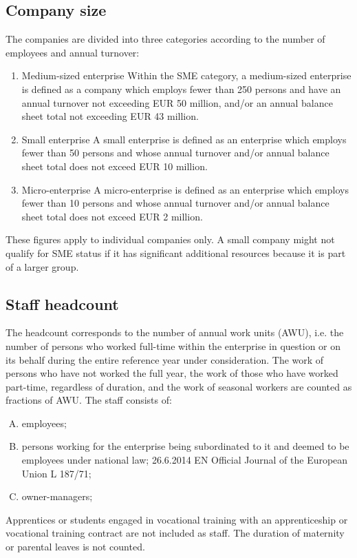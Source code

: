 \documentclass[12pt,oneside]{fithesis2}
\begin{document}
    \subsection{Company size}
    \noindent
    The companies are divided into three categories according to the number of employees and annual turnover:
    \begin{enumerate}
        \item Medium-sized enterprise
        \newline\newline
        Within the SME category, a medium-sized enterprise is defined as a company which employs fewer than 250 persons and have an annual turnover not exceeding EUR 50 million, and/or an annual balance sheet total not exceeding EUR 43 million.
        \item Small enterprise
        \newline\newline
        A small enterprise is defined as an enterprise which employs fewer than 50 persons and whose annual turnover and/or annual balance sheet total does not exceed EUR 10 million.
        \item Micro-enterprise
        \newline\newline
        A micro-enterprise is defined as an enterprise which employs fewer than 10 persons and whose annual turnover and/or annual balance sheet total does not exceed EUR 2 million.
    \end{enumerate}
    These figures apply to individual companies only. A small company might not qualify for SME status if it has significant additional resources because it is part of a larger group. \cite{eligibility}
    \subsection{Staff headcount}
    The headcount corresponds to the number of annual work units (AWU), i.e. the number of persons who worked full-time within the enterprise in question or on its behalf during the entire reference year under consideration. The work of persons who have not worked the full year, the work of those who have worked part-time, regardless of duration, and the work of seasonal workers are counted as fractions of AWU.
    \newline\newline
    The staff consists of:
    \begin{enumerate}[A)]
        \item employees;
        \item persons working for the enterprise being subordinated to it and deemed to be employees under national law; 26.6.2014 EN Official Journal of the European Union L 187/71;
        \item owner-managers;
    \end{enumerate}
    Apprentices or students engaged in vocational training with an apprenticeship or vocational training contract are not included as staff. The duration of maternity or parental leaves is not counted. \cite{eligibility}
\end{document}

